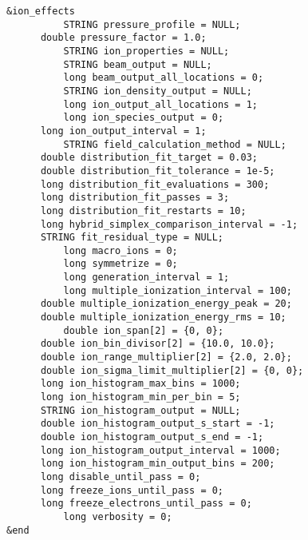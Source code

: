 \documentclass[11pt]{article}
\begin{document}
\begin{verbatim}
&ion_effects
          STRING pressure_profile = NULL;
	  double pressure_factor = 1.0;
          STRING ion_properties = NULL;
          STRING beam_output = NULL;
          long beam_output_all_locations = 0;
          STRING ion_density_output = NULL;
          long ion_output_all_locations = 1;
          long ion_species_output = 0;
	  long ion_output_interval = 1;	
          STRING field_calculation_method = NULL;
	  double distribution_fit_target = 0.03;
	  double distribution_fit_tolerance = 1e-5;
	  long distribution_fit_evaluations = 300;
	  long distribution_fit_passes = 3;
	  long distribution_fit_restarts = 10;
	  long hybrid_simplex_comparison_interval = -1;
	  STRING fit_residual_type = NULL;
          long macro_ions = 0;
          long symmetrize = 0;
          long generation_interval = 1;
          long multiple_ionization_interval = 100;
	  double multiple_ionization_energy_peak = 20;
	  double multiple_ionization_energy_rms = 10;
          double ion_span[2] = {0, 0};
	  double ion_bin_divisor[2] = {10.0, 10.0};
	  double ion_range_multiplier[2] = {2.0, 2.0};
	  double ion_sigma_limit_multiplier[2] = {0, 0};
	  long ion_histogram_max_bins = 1000;
	  long ion_histogram_min_per_bin = 5;
	  STRING ion_histogram_output = NULL;
	  double ion_histogram_output_s_start = -1;
	  double ion_histogram_output_s_end = -1;
	  long ion_histogram_output_interval = 1000;
	  long ion_histogram_min_output_bins = 200;
	  long disable_until_pass = 0;
	  long freeze_ions_until_pass = 0;
	  long freeze_electrons_until_pass = 0;
          long verbosity = 0;
&end
\end{verbatim}
\end{document}
